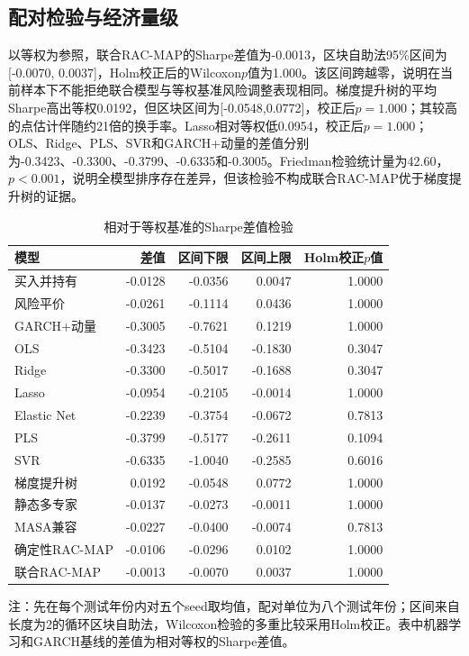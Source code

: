 \documentclass[UTF8,a4paper,zihao=-4]{ctexart}
\begin{document}
\subsection{配对检验与经济量级}
以等权为参照，联合RAC-MAP的Sharpe差值为-0.0013，区块自助法95\%区间为[-0.0070, 0.0037]，Holm校正后的Wilcoxon$p$值为1.000。该区间跨越零，说明在当前样本下不能拒绝联合模型与等权基准风险调整表现相同。梯度提升树的平均Sharpe高出等权0.0192，但区块区间为[-0.0548,0.0772]，校正后$p=1.000$；其较高的点估计伴随约21倍的换手率。Lasso相对等权低0.0954，校正后$p=1.000$；OLS、Ridge、PLS、SVR和GARCH+动量的差值分别为-0.3423、-0.3300、-0.3799、-0.6335和-0.3005。Friedman检验统计量为42.60，$p<0.001$，说明全模型排序存在差异，但该检验不构成联合RAC-MAP优于梯度提升树的证据。

\begin{table}[htbp]
\centering
\caption{相对于等权基准的Sharpe差值检验}
\label{tab:test}
\begin{tabular}{lrrrr}
\toprule
模型 & 差值 & 区间下限 & 区间上限 & Holm校正$p$值 \\
\midrule
买入并持有 & -0.0128 & -0.0356 & 0.0047 & 1.0000 \\
风险平价 & -0.0261 & -0.1114 & 0.0436 & 1.0000 \\
GARCH+动量 & -0.3005 & -0.7621 & 0.1219 & 1.0000 \\
OLS & -0.3423 & -0.5104 & -0.1830 & 0.3047 \\
Ridge & -0.3300 & -0.5017 & -0.1688 & 0.3047 \\
Lasso & -0.0954 & -0.2105 & -0.0014 & 1.0000 \\
Elastic Net & -0.2239 & -0.3754 & -0.0672 & 0.7813 \\
PLS & -0.3799 & -0.5177 & -0.2611 & 0.1094 \\
SVR & -0.6335 & -1.0040 & -0.2585 & 0.6016 \\
梯度提升树 & 0.0192 & -0.0548 & 0.0772 & 1.0000 \\
静态多专家 & -0.0137 & -0.0273 & -0.0011 & 1.0000 \\
MASA兼容 & -0.0227 & -0.0400 & -0.0074 & 0.7813 \\
确定性RAC-MAP & -0.0106 & -0.0296 & 0.0102 & 1.0000 \\
联合RAC-MAP & -0.0013 & -0.0070 & 0.0037 & 1.0000 \\
\bottomrule
\end{tabular}
\begin{tablenotes}[flushleft]
\item[]\footnotesize 注：先在每个测试年份内对五个seed取均值，配对单位为八个测试年份；区间来自长度为2的循环区块自助法，Wilcoxon检验的多重比较采用Holm校正。表中机器学习和GARCH基线的差值为相对等权的Sharpe差值。
\end{tablenotes}
\end{table}
\end{document}
